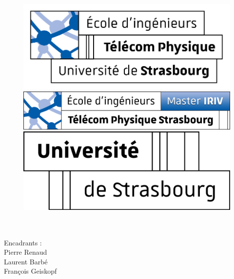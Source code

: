 \documentclass[10pt, a4paper]{article}
\begin{document}
\begin{titlepage}
\begin{center}
\begin{figure}[!htb]
\begin{adjustwidth}{-3cm}{-3cm}
\begin{minipage}{0.30\textwidth}
               \end{minipage}\hfill
               \begin{minipage}{0.30\textwidth}
                 \centering
                 \includegraphics[width=1\linewidth]{Logo/TPS.png}
               \end{minipage}\hfill
               \begin{minipage}{0.30\textwidth}
                 \centering
                 \includegraphics[width=1\linewidth]{Logo/IRIV.png}
               \end{minipage}\hfill
               \begin{minipage}{0.30\textwidth}
                 \centering
                 \includegraphics[width=1\linewidth]{Logo/Strasbourg.svg.png}
               \end{minipage}
               \end{adjustwidth}
            \end{figure}
            

            {\huge \bfseries  \@title }\\[15ex] 
            {\LARGE  \@author}\\[10ex] 
            {\large  Encadrants :}\\[2ex] 
            {\large  Pierre Renaud}\\[2ex] 
            {\large  Laurent Barbé}\\[2ex] 
            {\large  François Geiskopf}\\[17ex] 
            
            {\large \@date}
        \end{center}
        
    \end{titlepage}
\makeatother
\thispagestyle{empty}
\newpage
\end{document}

